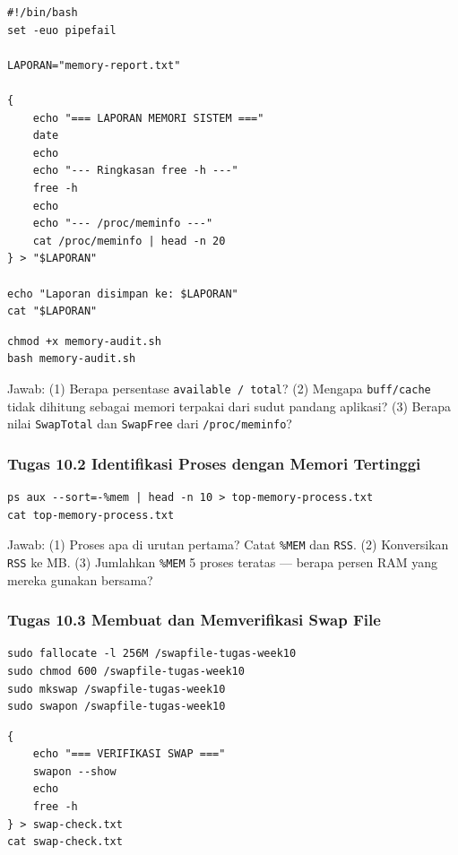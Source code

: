 \begin{lstlisting}[caption={Isi file memory-audit.sh}]
#!/bin/bash
set -euo pipefail

LAPORAN="memory-report.txt"

{
    echo "=== LAPORAN MEMORI SISTEM ==="
    date
    echo
    echo "--- Ringkasan free -h ---"
    free -h
    echo
    echo "--- /proc/meminfo ---"
    cat /proc/meminfo | head -n 20
} > "$LAPORAN"

echo "Laporan disimpan ke: $LAPORAN"
cat "$LAPORAN"
\end{lstlisting}

\begin{lstlisting}[caption={Jalankan script audit}]
chmod +x memory-audit.sh
bash memory-audit.sh
\end{lstlisting}

Jawab: (1) Berapa persentase \texttt{available / total}? (2) Mengapa \texttt{buff/cache}
tidak dihitung sebagai memori terpakai dari sudut pandang aplikasi? (3) Berapa nilai
\texttt{SwapTotal} dan \texttt{SwapFree} dari \texttt{/proc/meminfo}?

\subsubsection{Tugas 10.2 Identifikasi Proses dengan Memori Tertinggi}

\begin{lstlisting}[caption={Simpan daftar proses teratas}]
ps aux --sort=-%mem | head -n 10 > top-memory-process.txt
cat top-memory-process.txt
\end{lstlisting}

Jawab: (1) Proses apa di urutan pertama? Catat \texttt{\%MEM} dan \texttt{RSS}.
(2) Konversikan \texttt{RSS} ke MB. (3) Jumlahkan \texttt{\%MEM} 5 proses teratas
--- berapa persen RAM yang mereka gunakan bersama?

\subsubsection{Tugas 10.3 Membuat dan Memverifikasi Swap File}

\begin{lstlisting}[caption={Buat dan aktifkan swap file tugas}]
sudo fallocate -l 256M /swapfile-tugas-week10
sudo chmod 600 /swapfile-tugas-week10
sudo mkswap /swapfile-tugas-week10
sudo swapon /swapfile-tugas-week10
\end{lstlisting}

\begin{lstlisting}[caption={Verifikasi dan simpan hasil}]
{
    echo "=== VERIFIKASI SWAP ==="
    swapon --show
    echo
    free -h
} > swap-check.txt
cat swap-check.txt
\end{lstlisting}

